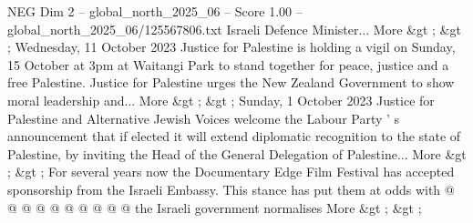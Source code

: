 \begin{textsample}{NEG Dim 2 – global\_north\_2025\_06 – Score 1.00 – global\_north\_2025\_06/125567806.txt}
Israeli Defence Minister...
More \&gt ; \&gt ; Wednesday, 11 October 2023 Justice for Palestine is holding a vigil on Sunday, 15 October at 3pm at Waitangi Park to stand together for peace, justice and a free Palestine.
Justice for Palestine urges the New Zealand Government to show moral leadership and...
More \&gt ; \&gt ; Sunday, 1 October 2023 Justice for Palestine and Alternative Jewish Voices welcome the Labour Party ' s announcement that if elected it will extend diplomatic recognition to the state of Palestine, by inviting the Head of the General Delegation of Palestine...
More \&gt ; \&gt ; For several years now the Documentary Edge Film Festival has accepted sponsorship from the Israeli Embassy.
This stance has put them at odds with @ @ @ @ @ @ @ @ @ @ the Israeli government normalises More \&gt ; \&gt ;

\end{textsample}
